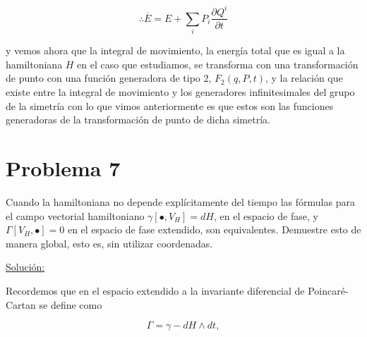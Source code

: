 \documentclass[a4paper,10pt]{article}
\makeatletter
\numberwithin{equation}{section}
\newcommand*{\boxcolor}{blue}
\renewcommand{\boxed}[1]{\textcolor{\boxcolor}{%
\tikz[baseline={([yshift=-1ex]current bounding box.center)}] \node [rectangle, minimum width=1ex,rounded corners,draw] {\normalcolor\m@th$\displaystyle#1$};}}
\makeatother
\begin{document}
\begin{equation}
 \therefore \overline{E} = E + \sum_i P_i \frac{\partial Q^i}{\partial t}
\end{equation}

y vemos ahora que la integral de movimiento, la energía total que es igual a la hamiltoniana $H$ en el caso 
que estudiamos, se transforma con una transformación de punto con una función generadora 
de tipo 2, $F_2(q,P,t)$, y la relación que existe entre la integral de movimiento y 
los generadores infinitesimales del grupo de la simetría con lo que vimos anteriormente 
es que estos son las funciones generadoras de la transformación de punto de dicha 
simetría. 


% 
% 
% 
% 
% 

\section{Problema 7}

Cuando la hamiltoniana no depende explícitamente del tiempo las fórmulas para el 
campo vectorial hamiltoniano $\gamma[\bullet,V_H] = dH$, en el espacio de fase, 
y $\Gamma[V_H,\bullet] = 0$ en el espacio de fase extendido, son equivalentes. 
Demuestre esto de manera global, esto es, sin utilizar coordenadas.

\vspace{.3cm}

\underline{Solución:} \vspace{.3cm}

Recordemos que en el espacio extendido a la invariante diferencial de Poincaré-Cartan 
se define como

\begin{equation}
 \Gamma = \gamma - dH \wedge dt,
 \label{eq:poincareCartan}
\end{equation}
\end{document}
